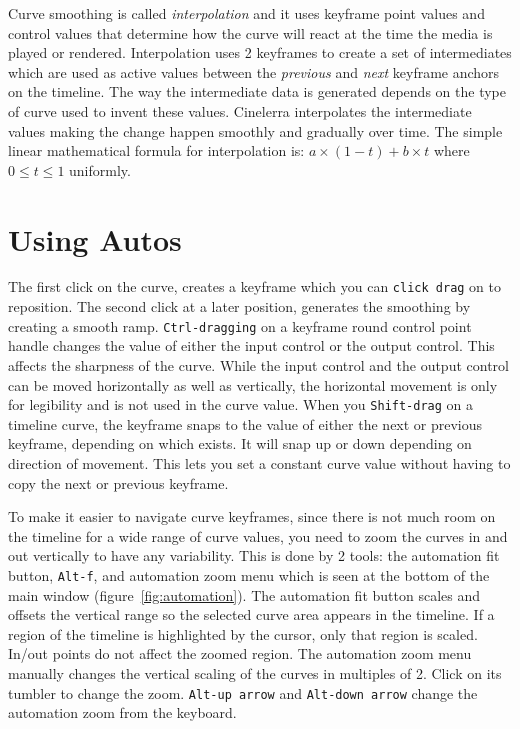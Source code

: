 Curve smoothing is called \textit{interpolation} and it uses keyframe point values and control values that determine how the curve will react at the time the media is played or rendered.  Interpolation uses 2 keyframes to create a set of intermediates which are used as active values between the \textit{previous} and \textit{next} keyframe anchors on the timeline.  The way the intermediate data is generated depends on the type of curve used to invent these values.  Cinelerra interpolates the intermediate values making the change happen smoothly and gradually over time.  The simple linear mathematical formula for interpolation is:   $a\times(1-t) + b\times t$    where $0\le t\le 1$ uniformly.

\section{Using Autos}%
\label{sec:using_autos}

The first click on the curve, creates a keyframe which you can \texttt{click drag} on to reposition.  The second click at a later position, generates the smoothing by creating a smooth ramp.  \texttt{Ctrl-dragging} on a keyframe round control point handle changes the value of either the input control or the output control.  This affects the sharpness of the curve.  While the input control and the output control can be moved horizontally as well as vertically, the horizontal movement is only for legibility and is not used in the curve value.  When you \texttt{Shift-drag} on a timeline curve, the keyframe snaps to the value of either the next or previous keyframe, depending on which exists.  It will snap up or down depending on direction of movement.  This lets you set a constant curve value without having to copy the next or previous keyframe.

To make it easier to navigate curve keyframes, since there is not much room on the timeline for a wide range of curve values, you need to zoom the curves in and out vertically to have any variability.  This is done by 2 tools: the automation fit button, \texttt{Alt-f}, and automation zoom menu which is seen at the bottom of the main window (figure~\ref{fig:automation}). The automation fit button scales and offsets the vertical range so the selected curve area appears in the timeline.  If a region of the timeline is highlighted by the cursor, only that region is scaled.  In/out points do not affect the zoomed region.  The automation zoom menu manually changes the vertical scaling of the curves in multiples of 2.  Click on its tumbler to change the zoom.  \texttt{Alt-up arrow} and \texttt{Alt-down arrow} change the automation zoom from the keyboard.

